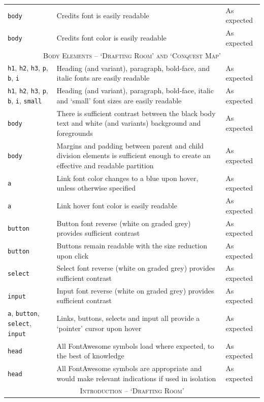 \documentclass[11pt, english]{article}
\begin{document}
\begin{center}
\begin{longtable}{p{3cm}p{8cm}p{2cm}}
		\texttt{body} & Credits font is easily readable & As expected\\
		\texttt{body} & Credits font color is easily readable & As expected\\
		\hline
		\multicolumn{3}{c}{\textsc{Body Elements -- `Drafting Room' and `Conquest Map'}}\\
		\hline
		\texttt{h1}, \texttt{h2}, \texttt{h3}, \texttt{p}, \texttt{b}, \texttt{i} & Heading (and variant), paragraph, bold-face, and italic fonts are easily readable & As expected\\
		\texttt{h1}, \texttt{h2}, \texttt{h3}, \texttt{p}, \texttt{b}, \texttt{i}, \texttt{small} & Heading (and variant), paragraph, bold-face, italic and `small' font sizes are easily readable & As expected\\
		\texttt{body} & There is sufficient contrast between the black body text and white (and variants) background and foregrounds & As expected\\
		\texttt{body} & Margins and padding between parent and child division elements is sufficient enough to create an effective and readable partition & As expected\\
		\texttt{a} & Link font color changes to a blue upon hover, unless otherwise specified & As expected\\
		\texttt{a} & Link hover font color is easily readable & As expected\\
		\texttt{button} & Button font reverse (white on graded grey) provides sufficient contrast & As expected\\
		\texttt{button} & Buttons remain readable with the size reduction upon click & As expected\\
		\texttt{select} & Select font reverse (white on graded grey) provides sufficient contrast & As expected\\
		\texttt{input} & Input font reverse (white on graded grey) provides sufficient contrast & As expected\\
		\texttt{a}, \texttt{button}, \texttt{select}, \texttt{input} & Links, buttons, selects and input all provide a `pointer' cursor upon hover & As expected\\
		\texttt{head} & All FontAwesome symbols load where expected, to the best of knowledge & As expected\\
		\texttt{head} & All FontAwesome symbols are appropriate and would make relevant indications if used in isolation & As expected\\
		\hline
		\multicolumn{3}{c}{\textsc{Introduction -- `Drafting Room'}}\\

\end{longtable}
\end{center}
\end{document}
